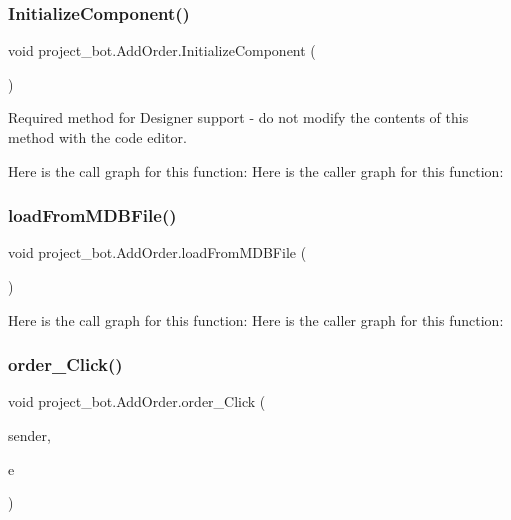 \subsubsection{\texorpdfstring{Initialize\+Component()}{InitializeComponent()}}
{\footnotesize\ttfamily void project\+\_\+bot.\+Add\+Order.\+Initialize\+Component (\begin{DoxyParamCaption}{ }\end{DoxyParamCaption})\hspace{0.3cm}{\ttfamily [private]}}



Required method for Designer support -\/ do not modify the contents of this method with the code editor. 

Here is the call graph for this function\+:
Here is the caller graph for this function\+:
\mbox{\label{classproject__bot_1_1_add_order_a7a2ef5caf24d7e09afb85ac0632dc71d}} 
\subsubsection{\texorpdfstring{load\+From\+M\+D\+B\+File()}{loadFromMDBFile()}}
{\footnotesize\ttfamily void project\+\_\+bot.\+Add\+Order.\+load\+From\+M\+D\+B\+File (\begin{DoxyParamCaption}{ }\end{DoxyParamCaption})}

Here is the call graph for this function\+:
Here is the caller graph for this function\+:
\mbox{\label{classproject__bot_1_1_add_order_a4632021406842a0822c18a161c117faa}} 
\subsubsection{\texorpdfstring{order\+\_\+\+Click()}{order\_Click()}}
{\footnotesize\ttfamily void project\+\_\+bot.\+Add\+Order.\+order\+\_\+\+Click (\begin{DoxyParamCaption}\item[{object}]{sender,  }\item[{Event\+Args}]{e }\end{DoxyParamCaption})\hspace{0.3cm}{\ttfamily [private]}}

